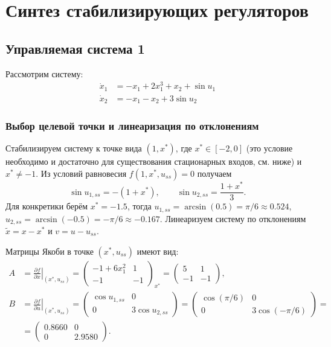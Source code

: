 \section*{Синтез стабилизирующих регуляторов}

\subsection*{Управляемая система 1}

Рассмотрим систему:
\begin{align}
\dot{x}_1 &= -x_1 + 2x_1^3 + x_2 + \sin u_1 \\
\dot{x}_2 &= -x_1 - x_2 + 3\sin u_2
\end{align}

\subsubsection*{Выбор целевой точки и линеаризация по отклонениям}

Стабилизируем систему к точке вида $(1,x^*)$, где $x^*\in[-2,0]$ (это условие необходимо и достаточно для существования стационарных входов, см. ниже) и $x^*\neq -1$.
Из условий равновесия $f(1,x^*,u_{ss})=0$ получаем
\[
\sin u_{1,ss} = -(1+x^*),\qquad \sin u_{2,ss} = \frac{1+x^*}{3}.
\]
Для конкретики берём $x^*=-1.5$, тогда $u_{1,ss}=\arcsin(0.5)=\pi/6\approx0.524$, $u_{2,ss}=\arcsin(-0.5)= -\pi/6\approx-0.167$.
Линеаризуем систему по отклонениям $\tilde x = x - x^*$ и $v = u - u_{ss}$.

Матрицы Якоби в точке $(x^*,u_{ss})$ имеют вид:
\begin{align*}
A &= \left.\frac{\partial f}{\partial x}\right|_{(x^*,u_{ss})} =
\begin{pmatrix}
-1 + 6x_1^2 & 1 \\
-1 & -1
\end{pmatrix}_{x^*} =
\begin{pmatrix}
5 & 1 \\
-1 & -1
\end{pmatrix}, \\
B &= \left.\frac{\partial f}{\partial u}\right|_{(x^*,u_{ss})} =
\begin{pmatrix}
\cos u_{1,ss} & 0 \\
0 & 3\cos u_{2,ss}
\end{pmatrix} =
\begin{pmatrix}
\cos(\pi/6) & 0 \\
0 & 3\cos(-\pi/6)
\end{pmatrix} = \\
&= \begin{pmatrix}
0.8660 & 0 \\
0 & 2.9580
\end{pmatrix}.
\end{align*}

